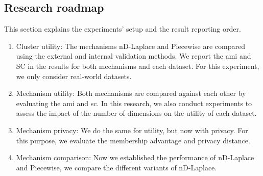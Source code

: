 \subsection{Research roadmap} \label{research-roadmap}
This section explains the experiments' setup and the result reporting order.
\begin{enumerate}
  \item Cluster utility: The mechanisms nD-Laplace and Piecewise are compared using the external and internal validation methods.
        We report the \gls{ami} and SC in the results for both mechanisms and each dataset.
        For this experiment, we only consider real-world datasets.
  \item Mechanism utility: Both mechanisms are compared against each other by evaluating the \gls{ami} and \gls{sc}.
        In this research, we also conduct experiments to assess the impact of the number of dimensions on the utility of each dataset.
  \item Mechanism privacy: We do the same for utility, but now with privacy.
        For this purpose, we evaluate the membership advantage and privacy distance.
  \item Mechanism comparison: Now we established the performance of nD-Laplace and Piecewise, we compare the different variants of nD-Laplace.

\end{enumerate}
